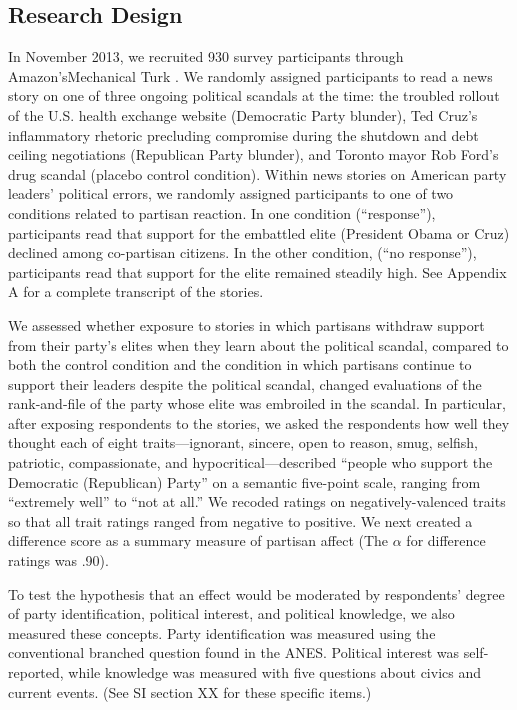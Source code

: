 \documentclass[12pt]{article}
\begin{document}
\subsection*{Research Design}
In November 2013, we recruited 930 survey participants through Amazon'sMechanical Turk \citep[see][]{BerinskyHuberLenz2012}. We randomly assigned participants to read a news story on one of three ongoing political scandals at the time: the troubled rollout of the U.S. health exchange website (Democratic Party blunder), Ted Cruz's inflammatory rhetoric precluding compromise during the shutdown and debt ceiling negotiations (Republican Party blunder), and Toronto mayor Rob Ford's drug scandal (placebo control condition). Within news stories on American party leaders' political errors, we randomly assigned participants to one of two conditions related to partisan reaction. In one condition (``response''), participants read that support for the embattled elite (President Obama or Cruz) declined among co-partisan citizens. In the other condition, (``no response''), participants read that support for the elite remained steadily high. See Appendix A for a complete transcript of the stories.

We assessed whether exposure to stories in which partisans withdraw support from their party's elites when they learn about the political scandal, compared to both the control condition and the condition in which partisans continue to support their leaders despite the political scandal, changed evaluations of the rank-and-file of the party whose elite was embroiled in the scandal. In particular, after exposing respondents to the stories, we asked the respondents how well they thought each of eight traits---ignorant, sincere, open to reason, smug, selfish, patriotic, compassionate, and hypocritical---described ``people who support the Democratic (Republican) Party'' on a semantic five-point scale, ranging from ``extremely well'' to ``not at all.'' We recoded ratings on negatively-valenced traits so that all trait ratings ranged from negative to positive. We next created a difference score as a summary measure of partisan affect (The $\alpha$ for difference ratings was .90).

To test the hypothesis that an effect would be moderated by respondents' degree of party identification, political interest, and political knowledge, we also measured these concepts. Party identification was measured using the conventional branched question found in the ANES. Political interest was self-reported, while knowledge was measured with five questions about civics and current events. (See SI section XX for these specific items.)
\end{document}

